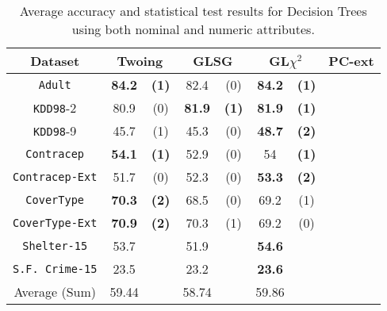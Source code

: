 \begin{table}
\small
\caption{Average accuracy and statistical test results for  Decision Trees using both nominal and numeric attributes.}
\centering
\begin{tabular}{c|cc|cc|cc|cc} 
Dataset            &\multicolumn{2}{c|}{Twoing} & \multicolumn{2}{c|}{GLSG} & \multicolumn{2}{c|}{GL$\chi^2$} & \multicolumn{2}{c}{PC-ext}\\  \hline   
{\tt Adult}        &   {\bf 84.2 }  & {\bf (1) }& 82.4       & (0)          &  {\bf 84.2} & {\bf (1) }        &             &             \\
{\tt KDD98}-2      & 80.9           & (0)       & {\bf 81.9 }& {\bf (1)}    & {\bf 81.9}  & {\bf (1)}         &             &             \\ 
{\tt KDD98}-9      & 45.7           &   (1)     & 45.3       &  (0)         & {\bf 48.7 } &{\bf  (2)  }       &             &             \\ 
{\tt Contracep}    &{\bf  54.1  }   &{\bf   (1)}& 52.9       &  (0)         & 54          &{\bf  (1) }        &             &             \\ 
{\tt Contracep-Ext}& 51.7           &  (0)      & 52.3       &  (0)         & {\bf 53.3 } & {\bf (2) }        &             &             \\ 
{\tt CoverType}    &  {\bf 70.3 }   &  {\bf (2)}& 68.5       &  (0)         &   69.2      &  (1)              &             &             \\ 
{\tt CoverType-Ext}& {\bf 70.9}     & {\bf (2) }& 70.3       &  (1)         &  69.2       & (0)               &             &             \\ 
{\tt Shelter-15}   &  53.7          &           & 51.9       &              & {\bf 54.6 } &                   &             &             \\   
{\tt S.F. Crime-15}& 23.5           &           & 23.2       &              & {\bf 23.6 } &                   &             &             \\ 
\hline
Average (Sum)      & 59.44          &           & 58.74      &              &      59.86  &                   &             &

\end{tabular}
\label{exp:secondsetnumeric}
\normalsize
\end{table}


